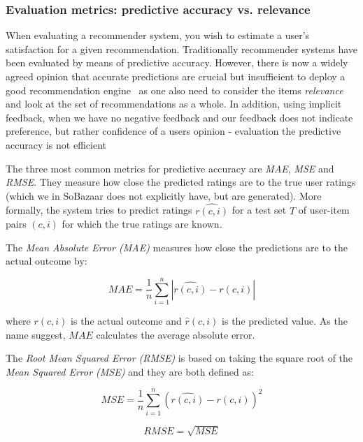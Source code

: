 \subsubsection{Evaluation metrics: predictive accuracy vs. relevance}
When evaluating a recommender system, you wish to estimate a user's
satisfaction for a given recommendation. Traditionally recommender systems have
been evaluated by means of predictive accuracy. However, there is now a widely
agreed opinion that accurate predictions are crucial but insufficient to deploy a good
recommendation engine~\cite{Shani2011, McNee2006} as one also need to consider
the items \textit{relevance} and look at the set of recommendations as a whole.
In addition, using implicit feedback, when we have no negative feedback and our
feedback does not indicate preference, but rather confidence of a users
opinion - evaluation the predictive accuracy is not efficient~\cite{something}

The three most common metrics for predictive accuracy are \textit{MAE},
\textit{MSE} and \textit{RMSE}. They measure how close the predicted ratings
are to the true user ratings (which we in SoBazaar does not explicitly have,
but are generated). More formally, the system tries to predict ratings
$\hat{r(c,i)}$ for a test set $T$ of user-item pairs $(c, i)$ for which the
true ratings are known.

The \textit{Mean Absolute Error (MAE)} measures how close the predictions are
to the actual outcome by:

\begin{equation}
    MAE = \frac{1}{n}\sum_{i=1}^{n}{|\hat{r(c,i)}-r(c,i)|}
    \label{equation:mae}
\end{equation}

where $r(c,i)$ is the actual outcome and $\hat{r}(c,i)$ is the predicted
value. As the name suggest, $MAE$ calculates the average absolute error.

The \textit{Root Mean Squared Error (RMSE)} is based on taking the square root
of the \textit{Mean Squared Error (MSE)} and they are both defined as:

\begin{equation}
    MSE = \frac{1}{n}\sum_{i=1}^{n}{(\hat{r(c,i)} - r(c,i))^{2}}
    \label{equation:mse}
\end{equation}

\begin{equation}
    RMSE = \sqrt{MSE}
    \label{equation:rmse}
\end{equation}

